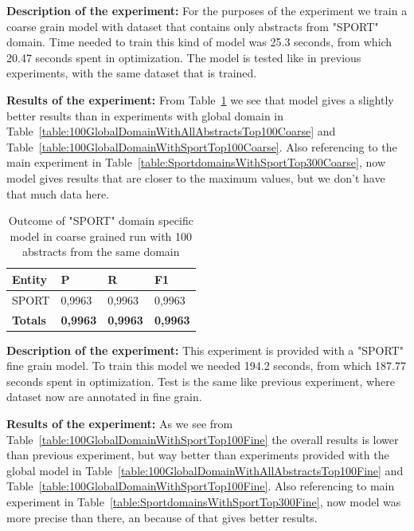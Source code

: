 \documentclass[thesis=M,english]{FITthesis}[2018/05/30]
\begin{document}

	\textbf{Description of the experiment:} For the purposes of the experiment we train a coarse grain model with dataset that contains only abstracts from "SPORT" domain. Time needed to train this kind of model was 25.3 seconds, from which 20.47 seconds spent in optimization. The model is tested like in previous experiments, with the same dataset that is trained.

	\textbf{Results of the experiment:} From Table~\ref{table:100SportDomainWithSportTop100Coarse} we see that model gives a slightly better results than in experiments with global domain in Table~\ref{table:100GlobalDomainWithAllAbstractsTop100Coarse} and Table~\ref{table:100GlobalDomainWithSportTop100Coarse}. Also referencing to the main experiment in Table~\ref{table:SportdomainsWithSportTop300Coarse}, now model gives results that are closer to the maximum values, but we don't have that much data here.

	\begin{table}[H]\centering
		\begin{tabular}{|l|l|l|l|}
			\hline {\textbf{Entity}} & {\textbf{P}} & {\textbf{R}} & {\textbf{F1}}\\\hline
				SPORT & 0,9963 & 0,9963 & 0,9963\\\hline
				\textbf{Totals} & \textbf{0,9963} & \textbf{0,9963} & \textbf{0,9963}\\\hline
		\end{tabular}
		\caption{Outcome of "SPORT" domain specific model in coarse grained run with 100 abstracts from the same domain \label{table:100SportDomainWithSportTop100Coarse}}
	\end{table}


	\textbf{Description of the experiment:} This experiment is provided with a "SPORT" fine grain model. To train this model we needed 194.2 seconds, from which 187.77 seconds spent in optimization. Test is the same like previous experiment, where dataset now are annotated in fine grain.

	\textbf{Results of the experiment:} As we see from Table~\ref{table:100GlobalDomainWithSportTop100Fine} the overall results is lower than previous experiment, but way better than experiments provided with the global model in Table~\ref{table:100GlobalDomainWithAllAbstractsTop100Fine} and Table~\ref{table:100GlobalDomainWithSportTop100Fine}. Also referencing to main experiment in Table~\ref{table:SportdomainsWithSportTop300Fine}, now model was more precise than there, an because of that gives better results.
\end{document}
